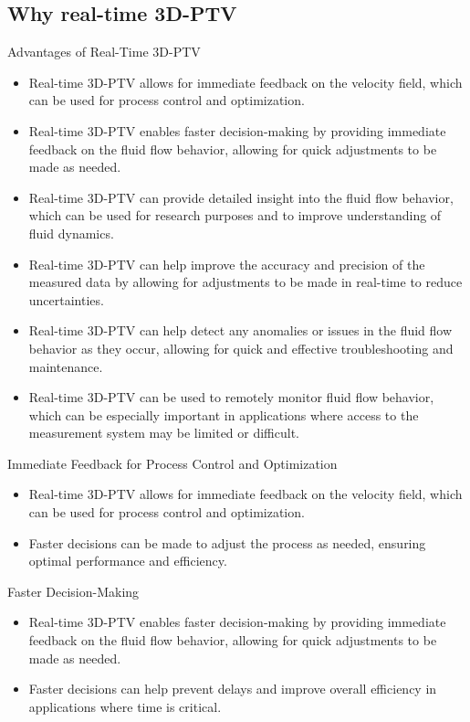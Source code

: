 \subsection{Why real-time 3D-PTV}

\begin{frame}{Advantages of Real-Time 3D-PTV}

\begin{itemize}
\item Real-time 3D-PTV allows for immediate feedback on the velocity field, which can be used for process control and optimization.
\item Real-time 3D-PTV enables faster decision-making by providing immediate feedback on the fluid flow behavior, allowing for quick adjustments to be made as needed.
\item Real-time 3D-PTV can provide detailed insight into the fluid flow behavior, which can be used for research purposes and to improve understanding of fluid dynamics.
\item Real-time 3D-PTV can help improve the accuracy and precision of the measured data by allowing for adjustments to be made in real-time to reduce uncertainties.
\item Real-time 3D-PTV can help detect any anomalies or issues in the fluid flow behavior as they occur, allowing for quick and effective troubleshooting and maintenance.
\item Real-time 3D-PTV can be used to remotely monitor fluid flow behavior, which can be especially important in applications where access to the measurement system may be limited or difficult.
\end{itemize}

\end{frame}

\begin{frame}{Immediate Feedback for Process Control and Optimization}

\begin{itemize}
\item Real-time 3D-PTV allows for immediate feedback on the velocity field, which can be used for process control and optimization.
\item Faster decisions can be made to adjust the process as needed, ensuring optimal performance and efficiency.
\end{itemize}

\end{frame}

\begin{frame}{Faster Decision-Making}

\begin{itemize}
\item Real-time 3D-PTV enables faster decision-making by providing immediate feedback on the fluid flow behavior, allowing for quick adjustments to be made as needed.
\item Faster decisions can help prevent delays and improve overall efficiency in applications where time is critical.
\end{itemize}

\end{frame}

